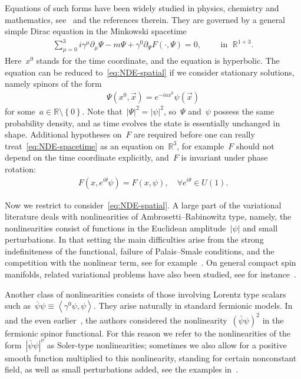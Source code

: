 \documentclass[11pt,final]{amsart}
\newcommand{\p}{\partial}
\newcommand{\R}{\mathbb{R}}
\newcommand{\Abracket}[1]{\left<#1\right>} %
\newcommand{\braces}[1]{\left\{#1\right\}} %
\begin{document}
Equations of such forms have been widely studied in physics, chemistry and mathematics, see~\cite{Esteban2002overview,Ranada1983Classical,Thaller1992Dirac} and the references therein. 
They are governed by a general simple Dirac equation in the Minkowski spacetime 
\begin{align}\label{eq:NDE-spacetime}
    \sum_{\mu=0}^3 i\gamma^\mu\p_\mu \Psi - m \Psi +\gamma^0 \p_\Psi F(\cdot,\Psi)=0, \qquad \mbox{ in } \; \R^{1+3}. 
\end{align}
Here~$x^0$ stands for the time coordinate, and the equation is hyperbolic. 
The equation can be reduced to~\eqref{eq:NDE-spatial} if we consider stationary solutions, namely spinors of the form
\begin{align}\label{eq:ansatz}
    \Psi(x^0, \vec{x}) = e^{-iax^0}\psi(\vec{x})
\end{align}
for some~$a\in \R\setminus\braces{0}$. 
Note that~$|\Psi|^2=|\psi|^2$, so~$\Psi$ and~$\psi$ possess the same probability density, and as time evolves the state is essentially unchanged in shape. 
Additional hypotheses on~$F$ are required before one can really treat~\eqref{eq:NDE-spacetime} as an equation on~$\R^3$, for example~$F$ should not depend on the time coordinate explicitly, and~$F$ is invariant under phase rotation:
\begin{align}
    F(x, e^{i\theta}\psi)=F(x,\psi), \quad \forall e^{i\theta} \in U(1). 
\end{align}
 
Now we restrict to consider~\eqref{eq:NDE-spatial}.
A large part of the variational literature deals with nonlinearities of Ambrosetti--Rabinowitz type, namely, the nonlinearities consist of functions in the Euclidean amplitude~$|\psi|$ and small perturbations. 
In that setting the main difficulties arise from the strong indefiniteness of the functional, failure of Palais--Smale conditions, and the competition with the nonlinear term, see for example~\cite{BartschDing2006Solutions,DingRuf2008Solutions,YangDing2012Stationary}.
On general compact spin manifolds, related variational problems have also been studied, see for instance~\cite{Ammann2003Habil, BartschXu2021spinorial, DingLiXu2016bifurcation, DingXu2025localized, Isobe2011nonlinear, Isobe2020Morse}. 



Another class of nonlinearities consists of those involving Lorentz type scalars such as~$\bar{\psi}\psi\equiv \Abracket{\gamma^0\psi,\psi}$. 
They arise naturally in standard fermionic models.
In~\cite{Soler1970Classical} and the even earlier~\cite{Finkelstein1951Non-linea}, the authors considered the nonlinearity~$ (\bar{\psi}\psi)^2$ in the fermionic spinor functional. 
For this reason we refer to the nonlinearities of the form~$|\bar{\psi}\psi|^\nu$ as Soler-type nonlinearities; sometimes we also allow for a positive smooth function multiplied to this nonlinearity, standing for certain nonconstant field, as well as small perturbations added, see the examples in~\cite{WZ2026Stationary}. 
\end{document}
